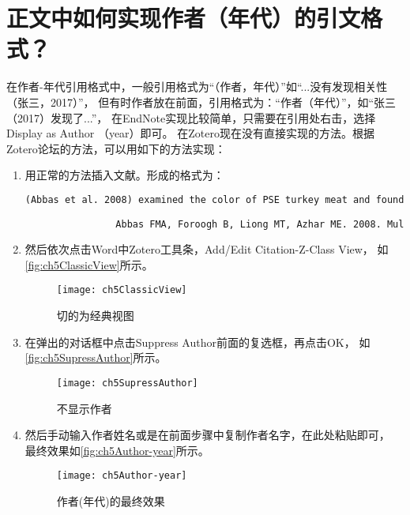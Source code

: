 \documentclass[cn,11pt,chinese]{elegantbook}
\begin{document}
		\section{正文中如何实现作者（年代）的引文格式？}\label{sec:author_year}
			在作者-年代引用格式中，一般引用格式为“（作者，年代）”如“...没有发现相关性（张三，2017）”，
			但有时作者放在前面，引用格式为：“作者（年代）”，如“张三（2017）发现了...”，
			在EndNote实现比较简单，只需要在引用处右击，选择Display as Author （year）即可。
			在Zotero现在没有直接实现的方法。根据Zotero论坛的方法，可以用如下的方法实现：
			\begin{enumerate}
			\item 用正常的方法插入文献。形成的格式为：\label{it:copyAuthor}
				\begin{lstlisting}[language=HTML]
				(Abbas et al. 2008) examined the color of PSE turkey meat and found that the L* value was significantly negative correlated.

				Abbas FMA, Foroogh B, Liong MT, Azhar ME. 2008. Multivariate statistical analysis of antioxidants in dates (phoenix dactylifera). Int. Food Res. J. 15(2):193–200
				\end{lstlisting}
			\item 然后依次点击Word中Zotero工具条，Add/Edit Citation-Z-Class View，
			如\autoref{fig:ch5ClassicView}所示。
				\begin{figure}[htbp]
					\centering
					\texttt{[image: ch5ClassicView]}
					\caption{切的为经典视图}
					\label{fig:ch5ClassicView}
				\end{figure}
			\item 在弹出的对话框中点击Suppress Author前面的复选框，再点击OK，
			如\autoref{fig:ch5SupressAuthor}所示。
				\begin{figure}[htbp]
					\centering
					\texttt{[image: ch5SupressAuthor]}
					\caption{不显示作者}
					\label{fig:ch5SupressAuthor}
				\end{figure}
			\item 然后手动输入作者姓名或是在前面步骤中复制作者名字，在此处粘贴即可，
			最终效果如\autoref{fig:ch5Author-year}所示。
				\begin{figure}[htbp]
					\centering
					\texttt{[image: ch5Author-year]}
					\caption{作者(年代)的最终效果}
					\label{fig:ch5Author-year}
				\end{figure}
			\end{enumerate}
\end{document}
